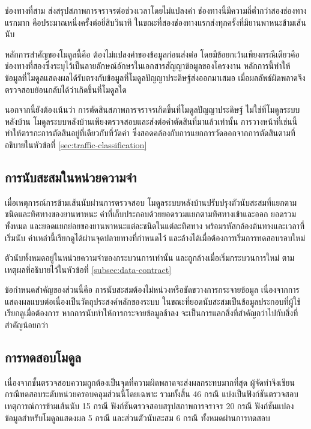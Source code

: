 ช่องทางที่สาม ส่งสรุปสภาพการจราจรต่อช่วงเวลาโดยไม่แปลงค่า ช่องทางนี้มีความถี่ต่ำกว่าสองช่องทางแรกมาก คือประมาณหนึ่งครั้งต่อยี่สิบวินาที ในขณะที่สองช่องทางแรกส่งทุกครั้งที่มียานพาหนะข้ามเส้นนับ

หลักการสำคัญของโมดูลนี้คือ ต้องไม่แปลงค่าของข้อมูลก่อนส่งต่อ โดยมีข้อยกเว้นเพียงกรณีเดียวคือช่องทางที่สองซึ่งระบุไว้เป็นลายลักษณ์อักษรในเอกสารสัญญาข้อมูลของโครงงาน  หลักการนี้ทำให้ข้อมูลที่โมดูลแสดงผลได้รับตรงกับข้อมูลที่โมดูลปัญญาประดิษฐ์ส่งออกมาเสมอ เมื่อผลลัพธ์ผิดพลาดจึงตรวจสอบย้อนกลับได้ว่าเกิดขึ้นที่โมดูลใด

นอกจากนี้ยังต้องเน้นว่า การตัดสินสภาพการจราจรเกิดขึ้นที่โมดูลปัญญาประดิษฐ์ ไม่ใช่ที่โมดูลระบบหลังบ้าน โมดูลระบบหลังบ้านเพียงตรวจสอบและส่งต่อคำตัดสินที่มาแล้วเท่านั้น  การวางหน้าที่เช่นนี้ทำให้ตรรกะการตัดสินอยู่ที่เดียวกับที่วัดค่า ซึ่งสอดคล้องกับการแยกการวัดออกจากการตัดสินตามที่อธิบายในหัวข้อที่ \ref{sec:traffic-classification}

\subsection{การนับสะสมในหน่วยความจำ}
\label{subsec:stats}

เมื่อเหตุการณ์การข้ามเส้นนับผ่านการตรวจสอบ โมดูลระบบหลังบ้านปรับปรุงตัวนับสะสมที่แยกตามชนิดและทิศทางของยานพาหนะ  ค่าที่เก็บประกอบด้วยยอดรวมแยกตามทิศทางเข้าและออก ยอดรวมทั้งหมด และยอดแยกย่อยของยานพาหนะแต่ละชนิดในแต่ละทิศทาง พร้อมรหัสกล้องต้นทางและเวลาที่เริ่มนับ ค่าเหล่านี้เรียกดูได้ผ่านจุดปลายทางที่กำหนดไว้ และล้างได้เมื่อต้องการเริ่มการทดสอบรอบใหม่

ตัวนับทั้งหมดอยู่ในหน่วยความจำของกระบวนการเท่านั้น และถูกล้างเมื่อเริ่มกระบวนการใหม่ ตามเหตุผลที่อธิบายไว้ในหัวข้อที่ \ref{subsec:data-contract}

ข้อกำหนดสำคัญของส่วนนี้คือ การนับสะสมต้องไม่หน่วงหรือขัดขวางการกระจายข้อมูล เนื่องจากการแสดงผลแบบต่อเนื่องเป็นวัตถุประสงค์หลักของระบบ ในขณะที่ยอดนับสะสมเป็นข้อมูลประกอบที่ผู้ใช้เรียกดูเมื่อต้องการ  หากการนับทำให้การกระจายข้อมูลช้าลง จะเป็นการแลกสิ่งที่สำคัญกว่าไปกับสิ่งที่สำคัญน้อยกว่า

\subsection{การทดสอบโมดูล}
\label{subsec:backend-tests}

เนื่องจากชั้นตรวจสอบความถูกต้องเป็นจุดที่ความผิดพลาดจะส่งผลกระทบมากที่สุด ผู้จัดทำจึงเขียนกรณีทดสอบระดับหน่วยครอบคลุมส่วนนี้โดยเฉพาะ รวมทั้งสิ้น 46 กรณี แบ่งเป็นฟังก์ชันตรวจสอบเหตุการณ์การข้ามเส้นนับ 15 กรณี ฟังก์ชันตรวจสอบสรุปสภาพการจราจร 20 กรณี ฟังก์ชันแปลงข้อมูลสำหรับโมดูลแสดงผล 5 กรณี และส่วนตัวนับสะสม 6 กรณี ทั้งหมดผ่านการทดสอบ

